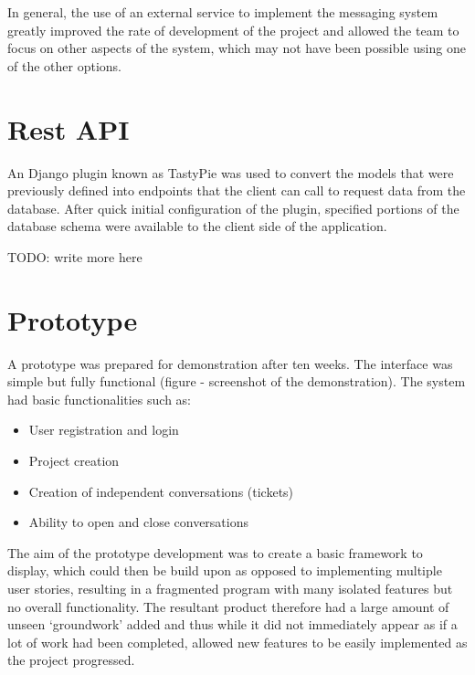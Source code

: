 \documentclass[a4paper]{l3proj}
\begin{document}
In general, the use of an external service to implement the messaging system greatly improved the rate of development of the project and allowed the team to focus on other aspects of the system, which may not have been possible using one of the other options.

\section{Rest API}
\label{restApi}

An Django plugin known as TastyPie was used to convert the models that were previously defined into endpoints that the client can call to request data from the database. After quick initial configuration of the plugin, specified portions of the database schema were available to the client side of the application. 

TODO: write more here
\section{Prototype}
\label{prototype}


A prototype was prepared for demonstration after ten weeks. The interface was simple but fully functional (figure - screenshot of the demonstration). The system had basic functionalities such as: 

\begin{itemize}
\item User registration and login
\item Project creation
\item Creation of independent conversations (tickets)
\item Ability to open and close conversations
\end{itemize}

The aim of the prototype development was to create a basic framework to display, which could then be build upon as opposed to implementing multiple user stories, resulting in a fragmented program with many isolated features but no overall functionality.  The resultant product therefore had a large amount of unseen ‘groundwork’ added and thus while it did not immediately appear as if a lot of work had been completed, allowed new features to be easily implemented as the project progressed. 

\end{document}
